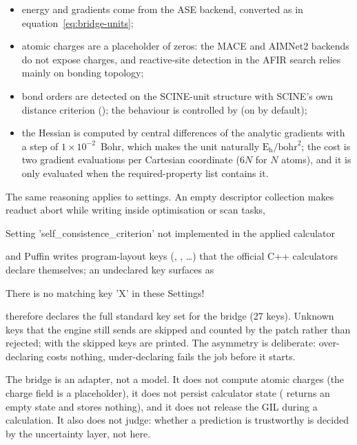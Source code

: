 \begin{itemize}
  \item energy and gradients come from the ASE backend, converted as in
        equation~\eqref{eq:bridge-units};
  \item atomic charges are a placeholder of zeros: the MACE and AIMNet2
        backends do not expose charges, and reactive-site detection in the
        AFIR search relies mainly on bonding topology;
  \item bond orders are detected on the SCINE-unit structure with SCINE's own
        distance criterion (); the
        behaviour is controlled by  (on by
        default);
  \item the Hessian is computed by central differences of the analytic
        gradients with a step of $1\times10^{-2}$~Bohr, which makes the unit
        naturally $\mathrm{E_h}/\mathrm{bohr}^2$; the cost is two gradient
        evaluations per Cartesian coordinate ($6N$ for $N$ atoms), and it is
        only evaluated when the required-property list contains it.
\end{itemize}

The same reasoning applies to settings.  An empty descriptor collection makes
readuct abort while writing  inside
optimisation or scan tasks,

\begin{transcript}
Setting 'self_consistence_criterion' not implemented in the applied calculator
\end{transcript}

and Puffin writes program-layout keys (,
, \dots) that the official C++ calculators declare
themselves; an undeclared key surfaces as

\begin{transcript}
There is no matching key 'X' in these Settings!
\end{transcript}

 therefore declares the full standard key set for
the bridge (27 keys).  Unknown keys that the engine still sends are skipped
and counted by the patch rather than rejected; with
 the skipped keys are printed.  The
asymmetry is deliberate: over-declaring costs nothing, under-declaring fails
the job before it starts.

\begin{refusalbox}
The bridge is an adapter, not a model.  It does not compute atomic charges
(the charge field is a placeholder), it does not persist calculator state
( returns an empty state and 
stores nothing), and it does not release the GIL during a calculation.  It
also does not judge: whether a prediction is trustworthy is decided by the
uncertainty layer, not here.
\end{refusalbox}


